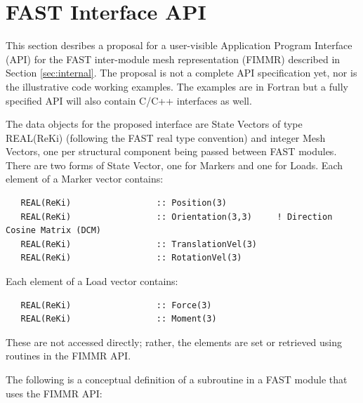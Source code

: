 \documentclass[11pt]{article}
\begin{document}
\section{FAST Interface API}
\label{sec:api}
This section desribes a proposal for a user-visible Application Program Interface (API) for the
FAST inter-module mesh representation (FIMMR) described in Section \ref{sec:internal}. The proposal
is not a complete API specification yet, nor is the illustrative code working examples.  The examples
are in Fortran but a fully specified API will also contain C/C++ interfaces as well.

The data objects for the proposed interface are State Vectors of type REAL(ReKi) (following the
FAST real type convention) and integer Mesh Vectors, one per structural component being passed 
between FAST modules. There are two forms of State Vector, one for Markers and one for Loads.  Each
element of a Marker vector contains:

\begin{verbatim}
   REAL(ReKi)                 :: Position(3)
   REAL(ReKi)                 :: Orientation(3,3)     ! Direction Cosine Matrix (DCM)
   REAL(ReKi)                 :: TranslationVel(3)
   REAL(ReKi)                 :: RotationVel(3)
\end{verbatim}

Each element of a Load vector contains:

\begin{verbatim}
   REAL(ReKi)                 :: Force(3)
   REAL(ReKi)                 :: Moment(3)
\end{verbatim}

These are not accessed directly; rather, the elements are set or retrieved using routines in the 
FIMMR API.

The following is a conceptual definition of a subroutine in a FAST module that uses the FIMMR API: 
\end{document}
